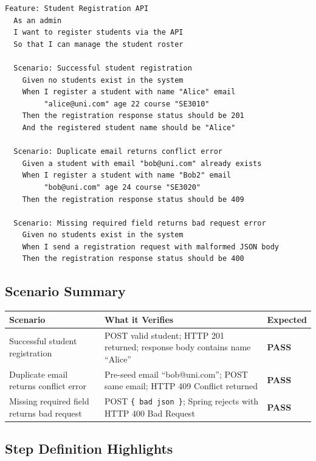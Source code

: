 \documentclass[12pt,a4paper]{article}
\begin{document}
\begin{lstlisting}[style=gherkinStyle, caption={student\_registration.feature -- Member 3}]
Feature: Student Registration API
  As an admin
  I want to register students via the API
  So that I can manage the student roster

  Scenario: Successful student registration
    Given no students exist in the system
    When I register a student with name "Alice" email
         "alice@uni.com" age 22 course "SE3010"
    Then the registration response status should be 201
    And the registered student name should be "Alice"

  Scenario: Duplicate email returns conflict error
    Given a student with email "bob@uni.com" already exists
    When I register a student with name "Bob2" email
         "bob@uni.com" age 24 course "SE3020"
    Then the registration response status should be 409

  Scenario: Missing required field returns bad request error
    Given no students exist in the system
    When I send a registration request with malformed JSON body
    Then the registration response status should be 400
\end{lstlisting}

\subsection{Scenario Summary}

\begin{tabularx}{\textwidth}{lX>{\bfseries}l}
\toprule
\textbf{Scenario} & \textbf{What it Verifies} & \textbf{Expected} \\
\midrule
Successful student registration
  & POST valid student; HTTP 201 returned; response body contains name ``Alice''
  & \textcolor{passgreen}{PASS} \\
\addlinespace
Duplicate email returns conflict error
  & Pre-seed email ``bob@uni.com''; POST same email; HTTP 409 Conflict returned
  & \textcolor{passgreen}{PASS} \\
\addlinespace
Missing required field returns bad request
  & POST \texttt{\{\ bad json\ \}}; Spring rejects with HTTP 400 Bad Request
  & \textcolor{passgreen}{PASS} \\
\bottomrule
\end{tabularx}

\subsection{Step Definition Highlights}
\end{document}
